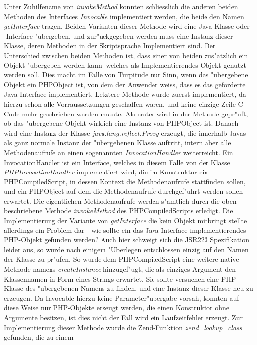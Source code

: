 Unter Zuhilfename von \emph{invokeMethod} konnten schliesslich die anderen beiden Methoden des Interfaces \emph{Invocable} implementiert werden, die beide
den Namen \emph{getInterface} tragen. Beiden Varianten dieser Methode wird eine Java-Klasse oder -Interface "ubergeben, und zur"uckgegeben werden muss eine 
Instanz dieser Klasse, deren Methoden in der Skriptsprache Implementiert sind. Der Unterschied zwischen beiden Methoden ist, dass einer von beiden 
zus"atzlich ein Objekt "ubergeben werden kann, welches als Implementierendes Objekt genutzt werden soll. Dies macht im Falle von Turpitude nur Sinn, wenn das 
"ubergebene Objekt ein PHPObject ist, von dem der Anwender weiss, dass es das geforderte Java-Interface implementiert. Letztere Methode wurde zuerst implementiert,
da hierzu schon alle Vorraussetzungen geschaffen waren, und keine einzige Zeile C-Code mehr geschrieben werden musste. Als erstes wird in der Methode gepr"uft, ob
das "ubergebene Objekt wirklich eine Instanz von PHPObject ist. Danach wird eine Instanz der Klasse \emph{java.lang.reflect.Proxy} erzeugt, die innerhalb Javas
als ganz normale Instanz der "ubergebenen Klasse auftritt, intern aber alle Methodenaufrufe an einen sogenannten \emph{InvocationHandler} weiterreicht.
Ein InvocationHandler ist ein Interface, welches in diesem Falle von der Klasse \emph{PHPInvocationHandler} implementiert wird, die im Konstruktor
ein PHPCompiledScript, in dessen Kontext die Methodenaufrufe stattfinden sollen, und ein PHPObject auf dem die Methodenaufrufe durchgef"uhrt werden sollen erwartet.
Die eigentlichen Methodenaufrufe werden s"amtlich durch die oben beschriebene Methode \emph{invokeMethod} des PHPCompiledScripts erledigt.
Die Implementierung der Variante von \emph{getInterface} die kein Objekt mitbringt stellte allerdings ein Problem dar - wie sollte ein das Java-Interface implementierendes
PHP-Objekt gefunden werden? Auch hier schweigt sich die JSR223 Spezifikation leider aus, so wurde nach einigem "Uberlegen entschlossen einzig auf den Namen der Klasse zu
pr"ufen. So wurde dem PHPCompiledScript eine weitere native Methode namens \emph{createInstance} hinzugef"ugt, die als einziges Argument den 
Klassennamen in Form eines Strings erwartet. Sie sollte versuchen eine PHP-Klasse des "ubergebenen Namens zu finden, und eine Instanz dieser Klasse neu zu erzeugen.
Da Invocable hierzu keine Parameter"ubergabe vorsah, konnten auf diese Weise nur PHP-Objekte erzeugt werden, die einen Konstruktor ohne Argumente besitzen, ist 
dies nicht der Fall wird ein Laufzeitfehler erzeugt. Zur Implementierung dieser Methode wurde die Zend-Funktion \emph{zend\_lookup\_class} gefunden, die zu einem
